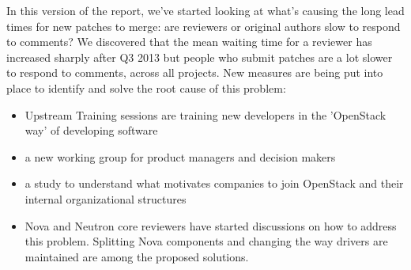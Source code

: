 \documentclass[a4wide,11pt]{report}
\begin{document}
In this version of the report, we've started looking at what's causing the long lead times for new patches to merge: are reviewers or original authors slow to respond to comments? We discovered that the mean waiting time for a reviewer has increased sharply after Q3 2013 but people who submit patches are a lot slower to respond to comments, across all projects. New measures are being put into place to identify and solve the root cause of this problem: 

\begin{itemize}
\item Upstream Training sessions are training new developers in the 'OpenStack way' of developing software
\item a new working group for product managers and decision makers 
\item a study to understand what motivates companies to join OpenStack and their internal organizational structures
\item Nova and Neutron core reviewers have started discussions on how to address this problem. Splitting Nova components and changing the way drivers are maintained are among the proposed solutions.
\end{itemize}
\end{document}
